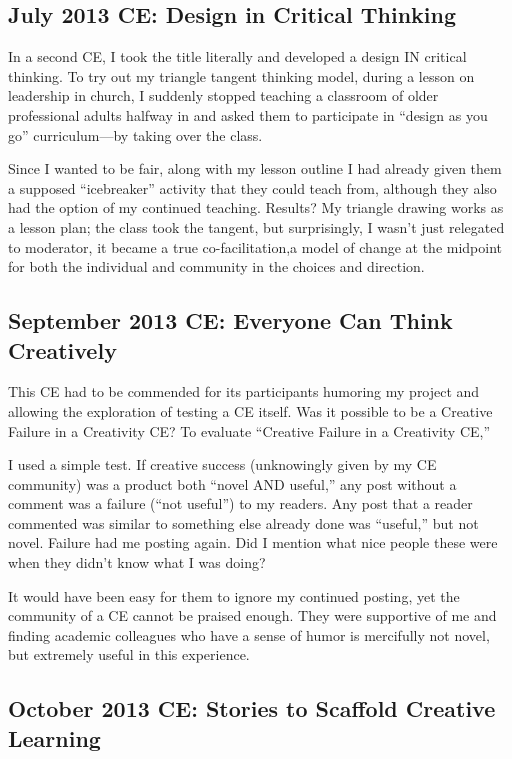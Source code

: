\subsection{July 2013 CE: Design in Critical Thinking}

In a second CE, I took the title literally and developed a design IN
critical thinking. To try out my triangle tangent thinking model, during
a lesson on leadership in church, I suddenly stopped teaching a
classroom of older professional adults halfway in and asked them to
participate in ``design as you go'' curriculum---by taking over the
class. 

Since I wanted to be fair, along with my lesson outline I had
already given them a supposed ``icebreaker'' activity that they could
teach from, although they also had the option of my continued teaching.
Results? My triangle drawing works as a lesson plan; the class took the
tangent, but surprisingly, I wasn't just relegated to moderator, it
became a true co-facilitation,a model of change at the midpoint for both
the individual and community in the choices and direction.

\subsection{September 2013 CE: Everyone Can Think Creatively}

This CE had to be commended for its participants humoring my project and
allowing the exploration of testing a CE itself. Was it possible to be a
Creative Failure in a Creativity CE? To evaluate ``Creative Failure in a
Creativity CE,''

I used a simple test. If creative success (unknowingly given by my CE
community) was a product both ``novel AND useful,'' any post without a
comment was a failure (``not useful'') to my readers. Any post that a
reader commented was similar to something else already done was
``useful,'' but not novel. Failure had me posting again. Did I mention
what nice people these were when they didn't know what I was doing?

It would have been easy for them to ignore my continued posting,
yet the community of a CE cannot be praised enough. They were supportive
of me and finding academic colleagues who have a sense of humor is
mercifully not novel, but extremely useful in this experience.

\subsection{October 2013 CE: Stories to Scaffold Creative Learning}

